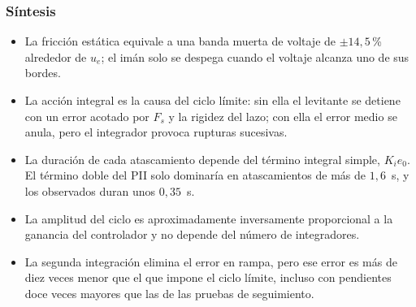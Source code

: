 \subsubsection{Síntesis}

\begin{itemize}
  \item La fricción estática equivale a una banda muerta de voltaje de $\pm14{,}5$\,\% alrededor de $u_e$; el imán solo se despega cuando el voltaje alcanza uno de sus bordes.
  \item La acción integral es la causa del ciclo límite: sin ella el levitante se detiene con un error acotado por $F_s$ y la rigidez del lazo; con ella el error medio se anula, pero el integrador provoca rupturas sucesivas.
  \item La duración de cada atascamiento depende del término integral simple, $K_i e_0$. El término doble del PII solo dominaría en atascamientos de más de $1{,}6$~s, y los observados duran unos $0{,}35$~s.
  \item La amplitud del ciclo es aproximadamente inversamente proporcional a la ganancia del controlador y no depende del número de integradores.
  \item La segunda integración elimina el error en rampa, pero ese error es más de diez veces menor que el que impone el ciclo límite, incluso con pendientes doce veces mayores que las de las pruebas de seguimiento.
\end{itemize}

\FloatBarrier
